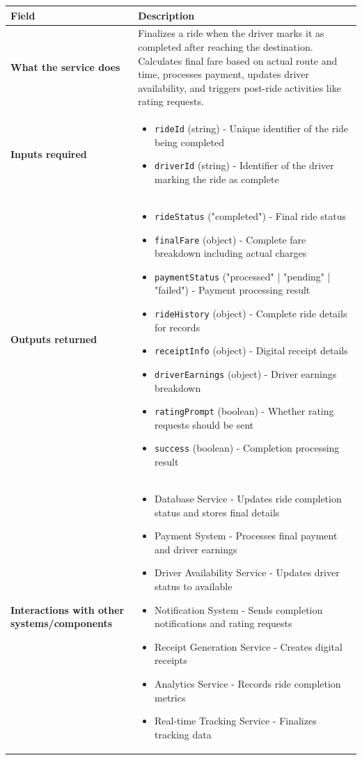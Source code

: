 \documentclass[11pt,a4paper]{article}
\begin{document}
\begin{longtable}{|p{4cm}|p{12cm}|}
\hline
\textbf{Field} & \textbf{Description} \\
\hline
\textbf{What the service does} & 
Finalizes a ride when the driver marks it as completed after reaching the destination. Calculates final fare based on actual route and time, processes payment, updates driver availability, and triggers post-ride activities like rating requests. \\
\hline
\textbf{Inputs required} & 
\begin{itemize}[nosep]
\item \texttt{rideId} (string) - Unique identifier of the ride being completed
\item \texttt{driverId} (string) - Identifier of the driver marking the ride as complete
\end{itemize} \\
\hline
\textbf{Outputs returned} & 
\begin{itemize}[nosep]
\item \texttt{rideStatus} ("completed") - Final ride status
\item \texttt{finalFare} (object) - Complete fare breakdown including actual charges
\item \texttt{paymentStatus} ("processed" | "pending" | "failed") - Payment processing result
\item \texttt{rideHistory} (object) - Complete ride details for records
\item \texttt{receiptInfo} (object) - Digital receipt details
\item \texttt{driverEarnings} (object) - Driver earnings breakdown
\item \texttt{ratingPrompt} (boolean) - Whether rating requests should be sent
\item \texttt{success} (boolean) - Completion processing result
\end{itemize} \\
\hline
\textbf{Interactions with other systems/components} & 
\begin{itemize}[nosep]
\item Database Service - Updates ride completion status and stores final details
\item Payment System - Processes final payment and driver earnings
\item Driver Availability Service - Updates driver status to available
\item Notification System - Sends completion notifications and rating requests
\item Receipt Generation Service - Creates digital receipts
\item Analytics Service - Records ride completion metrics
\item Real-time Tracking Service - Finalizes tracking data
\end{itemize} \\
\hline
\end{longtable}
\end{document}

